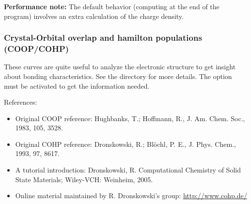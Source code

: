 \textbf{Performance note:}
The default behavior (computing at the end of the program) involves
an extra calculation of the charge density.

\subsubsection{Crystal-Orbital overlap and hamilton populations (COOP/COHP)}
\label{sec:coop}

These curves are quite useful to analyze the electronic structure to
get insight about bonding characteristics. See the 
directory for more details. The  option must be
activated to get the information needed.

References:
\begin{itemize}
  \item%
  Original COOP reference:
  Hughbanks, T.; Hoffmann, R., J. Am. Chem. Soc., 1983, 105, 3528.

  \item%
  Original COHP reference: Dronskowski, R.; Blöchl, P. E., J. Phys. Chem., 1993, 97, 8617.

  \item%
  A tutorial introduction: Dronskowski, R. Computational Chemistry of Solid State
  Materials; Wiley-VCH: Weinheim, 2005.

  \item%
  Online material maintained by R. Dronskowski's group: \url{http://www.cohp.de/}
\end{itemize}


